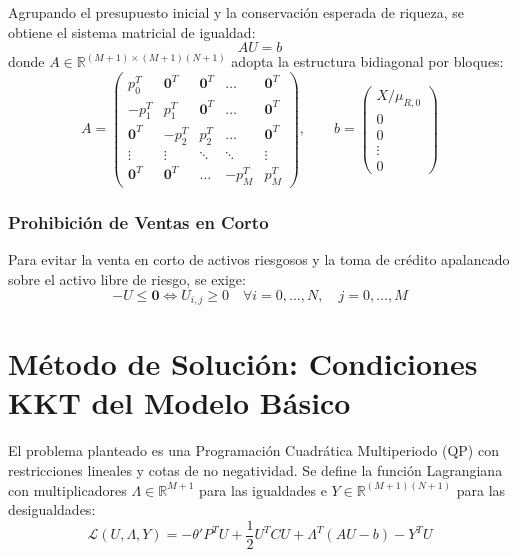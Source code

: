 \documentclass[11pt,a4paper]{article}
\begin{document}
Agrupando el presupuesto inicial y la conservación esperada de riqueza, se obtiene el sistema matricial de igualdad:
\begin{equation}
    AU = b
\end{equation}
donde $A \in \mathbb{R}^{(M+1)\times (M+1)(N+1)}$ adopta la estructura bidiagonal por bloques:
\begin{equation}
A = \begin{pmatrix}
p_0^T & \mathbf{0}^T & \mathbf{0}^T & \dots & \mathbf{0}^T \\
-p_1^T & p_1^T & \mathbf{0}^T & \dots & \mathbf{0}^T \\
\mathbf{0}^T & -p_2^T & p_2^T & \dots & \mathbf{0}^T \\
\vdots & \vdots & \ddots & \ddots & \vdots \\
\mathbf{0}^T & \mathbf{0}^T & \dots & -p_M^T & p_M^T
\end{pmatrix}, \qquad
b = \begin{pmatrix} X / \mu_{R,0} \\ 0 \\ 0 \\ \vdots \\ 0 \end{pmatrix}
\end{equation}

\subsubsection{Prohibición de Ventas en Corto}
Para evitar la venta en corto de activos riesgosos y la toma de crédito apalancado sobre el activo libre de riesgo, se exige:
\begin{equation}
    -U \le \mathbf{0} \iff U_{i,j} \ge 0 \quad \forall i = 0, \dots, N, \quad j = 0, \dots, M
\end{equation}

\section{Método de Solución: Condiciones KKT del Modelo Básico}
El problema planteado es una Programación Cuadrática Multiperiodo (QP) con restricciones lineales y cotas de no negatividad. Se define la función Lagrangiana con multiplicadores $\Lambda \in \mathbb{R}^{M+1}$ para las igualdades e $Y \in \mathbb{R}^{(M+1)(N+1)}$ para las desigualdades:
\begin{equation}
    \mathcal{L}(U, \Lambda, Y) = -\theta' P^T U + \frac{1}{2} U^T C U + \Lambda^T (AU - b) - Y^T U
\end{equation}
\end{document}
